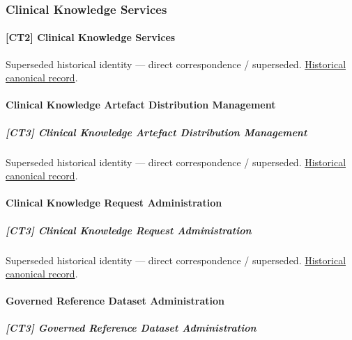 \subsubsection{Clinical Knowledge Services}

\paragraph{[CT2] Clinical Knowledge Services}

\par\label{element:5b8478b08c3f42c0a3480edb8f0b9ea7}
Superseded historical identity — direct correspondence / superseded. \href{../../../../continuum/strategy/capability/5b8478b08c3f42c0a3480edb8f0b9ea7.md}{Historical canonical record}.\par

\paragraph{Clinical Knowledge Artefact Distribution Management}

\subparagraph{[CT3] Clinical Knowledge Artefact Distribution Management}

\par\label{element:d81e0d6d76014066a682e3d9e03e5f8a}
Superseded historical identity — direct correspondence / superseded. \href{../../../../continuum/strategy/capability/d81e0d6d76014066a682e3d9e03e5f8a.md}{Historical canonical record}.\par

\paragraph{Clinical Knowledge Request Administration}

\subparagraph{[CT3] Clinical Knowledge Request Administration}

\par\label{element:eb370c01fbdb4d22956d97e9ecd74b57}
Superseded historical identity — direct correspondence / superseded. \href{../../../../continuum/strategy/capability/eb370c01fbdb4d22956d97e9ecd74b57.md}{Historical canonical record}.\par

\paragraph{Governed Reference Dataset Administration}

\subparagraph{[CT3] Governed Reference Dataset Administration}

